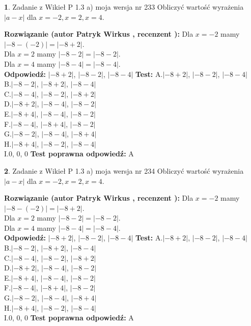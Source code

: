 \documentclass[12pt, a4paper]{article}
\theoremstyle{definition} %
\newtheorem{zad}{}
\newcommand{\zadStart}[1]{\begin{zad}#1\newline}
\newcommand{\zadStop}{\end{zad}}
\newcommand{\rozwStart}[2]{\noindent \textbf{Rozwiązanie (autor #1 , recenzent #2): }\newline}
\newcommand{\rozwStop}{\newline}
\newcommand{\odpStart}{\noindent \textbf{Odpowiedź:}\newline}
\newcommand{\odpStop}{\newline}
\newcommand{\testStart}{\noindent \textbf{Test:}\newline}
\newcommand{\testStop}{\newline}
\newcommand{\kluczStart}{\noindent \textbf{Test poprawna odpowiedź:}\newline}
\newcommand{\kluczStop}{\newline}
\begin{document}
\zadStart{Zadanie z Wikieł P 1.3 a) moja wersja nr 233}
Obliczyć wartość wyrażenia $|a - x|$ dla $x=-2,x=2,x=4$.
\zadStop
\rozwStart{Patryk Wirkus}{}
Dla $x = -2$ mamy $|-8 - (-2)| = |-8 + 2|$.\\
Dla $x = 2$ mamy $|-8 - 2| = |-8 - 2|$.\\
Dla $x = 4$ mamy $|-8 - 4| = |-8 - 4|$.\\
\rozwStop
\odpStart
$|-8 + 2|$, $|-8 - 2|$, $|-8 - 4|$
\odpStop
\testStart
A.$|-8 + 2|$, $|-8 - 2|$, $|-8 - 4|$\\
B.$|-8 - 2|$, $|-8 + 2|$, $|-8 - 4|$\\
C.$|-8 - 4|$, $|-8 - 2|$, $|-8 + 2|$\\
D.$|-8 + 2|$, $|-8 - 4|$, $|-8 - 2|$\\
E.$|-8 + 4|$, $|-8 - 4|$, $|-8 - 2|$\\
F.$|-8 - 4|$, $|-8 + 4|$, $|-8 - 2|$\\
G.$|-8 - 2|$, $|-8 - 4|$, $|-8 + 4|$\\
H.$|-8 + 4|$, $|-8 - 2|$, $|-8 - 4|$\\
I.$0$, $0$, $0$
\testStop
\kluczStart
A
\kluczStop



\zadStart{Zadanie z Wikieł P 1.3 a) moja wersja nr 234}
Obliczyć wartość wyrażenia $|a - x|$ dla $x=-2,x=2,x=4$.
\zadStop
\rozwStart{Patryk Wirkus}{}
Dla $x = -2$ mamy $|-8 - (-2)| = |-8 + 2|$.\\
Dla $x = 2$ mamy $|-8 - 2| = |-8 - 2|$.\\
Dla $x = 4$ mamy $|-8 - 4| = |-8 - 4|$.\\
\rozwStop
\odpStart
$|-8 + 2|$, $|-8 - 2|$, $|-8 - 4|$
\odpStop
\testStart
A.$|-8 + 2|$, $|-8 - 2|$, $|-8 - 4|$\\
B.$|-8 - 2|$, $|-8 + 2|$, $|-8 - 4|$\\
C.$|-8 - 4|$, $|-8 - 2|$, $|-8 + 2|$\\
D.$|-8 + 2|$, $|-8 - 4|$, $|-8 - 2|$\\
E.$|-8 + 4|$, $|-8 - 4|$, $|-8 - 2|$\\
F.$|-8 - 4|$, $|-8 + 4|$, $|-8 - 2|$\\
G.$|-8 - 2|$, $|-8 - 4|$, $|-8 + 4|$\\
H.$|-8 + 4|$, $|-8 - 2|$, $|-8 - 4|$\\
I.$0$, $0$, $0$
\testStop
\kluczStart
A
\kluczStop
\end{document}
